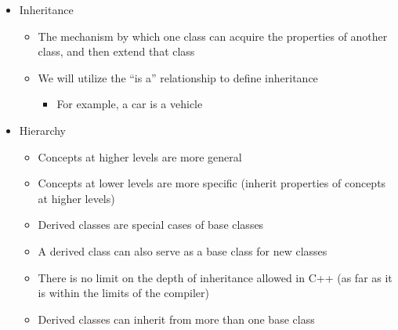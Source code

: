 \begin{itemize}

  \item Inheritance

    \begin{itemize}

      \item The mechanism by which one class can acquire the properties of another class, and then extend that class

      \item We will utilize the ``is a'' relationship to define inheritance

        \begin{itemize}
            
          \item For example, a car is a vehicle

        \end{itemize}

    \end{itemize}

  \item Hierarchy

    \begin{itemize}

      \item Concepts at higher levels are more general

      \item Concepts at lower levels are more specific (inherit properties of concepts at higher levels)

      \item Derived classes are special cases of base classes

      \item A derived class can also serve as a base class for new classes

      \item There is no limit on the depth of inheritance allowed in C++ (as far as it is within the limits of the compiler)

      \item Derived classes can inherit from more than one base class

    \end{itemize}

\end{itemize}



